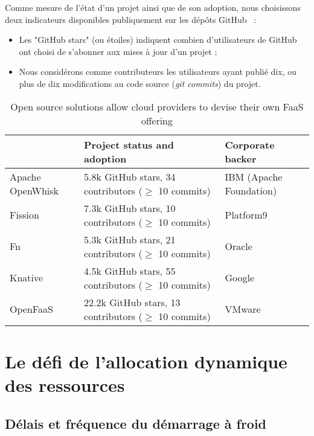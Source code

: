 Comme mesure de l'état d'un projet ainsi que de son adoption, nous choisissons deux indicateurs disponibles publiquement sur les dépôts GitHub~\cite{github} :

\begin{itemize}
    \item Les "GitHub stars" (ou étoiles) indiquent combien d'utilisateurs de GitHub ont choisi de s'abonner aux mises à jour d'un projet ;
    \item Nous considérons comme contributeurs les utilisateurs ayant publié dix, ou plus de dix modifications au code source (\textit{git commits}) du projet.
\end{itemize}

\begin{table}[H]
\caption{Open source solutions allow cloud providers to devise their own FaaS offering}
\centering
\begin{tabularx}{\textwidth} { 
  | >{\centering\arraybackslash}X 
  | >{\centering\arraybackslash}X 
  | >{\centering\arraybackslash}X  | }
\hline
                       & \textbf{Project status and adoption} & \textbf{Corporate backer} \\ \hline
Apache OpenWhisk       & 5.8k GitHub stars, 34 contributors ($\geq$ 10 commits) & IBM (Apache Foundation)             \\ \hline
Fission                & 7.3k GitHub stars, 10 contributors ($\geq$ 10 commits) & Platform9             \\ \hline
Fn                     & 5.3k GitHub stars, 21 contributors ($\geq$ 10 commits) & Oracle             \\ \hline
Knative                & 4.5k GitHub stars, 55 contributors ($\geq$ 10 commits) & Google             \\ \hline
OpenFaaS               & 22.2k GitHub stars, 13 contributors ($\geq$ 10 commits) & VMware             \\ \hline
\end{tabularx}
\label{table:foss-faas}
\end{table}

\section{Le défi de l'allocation dynamique des ressources}

\subsection{Délais et fréquence du démarrage à froid}
\label{sota-cold-start}

